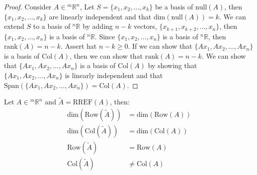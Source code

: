 \documentclass[11pt]{report}
\begin{document}
\begin{proof}
    Consider $A \in {^m\mathbb{R}^n}$, Let $S = \{x_1, x_2, \ldots, x_k\}$ be a basis of $\text{null}(A)$, then $\{x_1, x_2, \ldots, x_k\}$ are linearly independent and that $\text{dim}(\text{null}(A)) = k$. We can extend $S$ to a basis of $^n\mathbb{R}$ by adding $n-k$ vectors, $\{x_{k+1}, x_{k+2}, \ldots, x_n\}$, then $\{x_1, x_2, \ldots, x_n\}$ is a basis of $^n\mathbb{R}$. Since $\{x_1, x_2, \ldots, x_n\}$ is a basis of $^n\mathbb{R}$, then $\text{rank}(A) = n - k$. Assert hat $n-k \ge 0$. If we can show that $\{Ax_1, Ax_2, \ldots, Ax_n\}$ is a basis of $\text{Col}(A)$, then we can show that $\text{rank}(A) = n - k$. We can show that $\{Ax_1, Ax_2, \ldots, Ax_n\}$ is a basis of $\text{Col}(A)$ by showing that $\{Ax_1, Ax_2, \ldots, Ax_n\}$ is linearly independent and that $\text{Span}(\{Ax_1, Ax_2, \ldots, Ax_n\}) = \text{Col}(A)$.
    
\end{proof}
\begin{theorem}
    Let $A \in {^m\mathbb{R}^n}$ and $\tilde{A} = \text{RREF}(A)$, then:
    \begin{align}
        \text{dim}(\text{Row}(\tilde{A})) &= \text{dim}(\text{Row}(A)) \\
        \text{dim}(\text{Col}(\tilde{A})) &= \text{dim}(\text{Col}(A)) \\
        \text{Row}(\tilde{A}) &= \text{Row}(A) \\
        \text{Col}(\tilde{A}) &\neq \text{Col}(A)
    \end{align}
\end{theorem}
\end{document}
